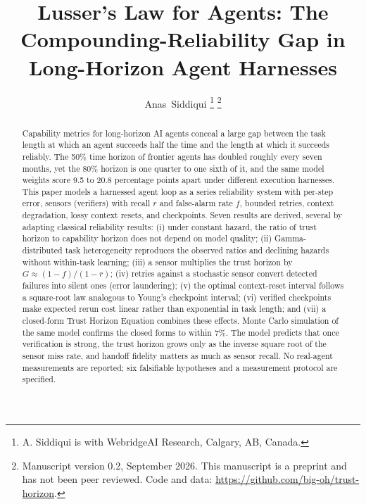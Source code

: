\documentclass[journal]{IEEEtran}
\begin{document}

\title{Lusser's Law for Agents: The Compounding-Reliability Gap in Long-Horizon Agent Harnesses}

\author{Anas~Siddiqui%
\thanks{A. Siddiqui is with WebridgeAI Research, Calgary, AB, Canada.}%
\thanks{Manuscript version 0.2, September 2026. This manuscript is a preprint and has not been peer reviewed. Code and data: \url{https://github.com/big-oh/trust-horizon}.}}


\maketitle

\begin{abstract}
Capability metrics for long-horizon AI agents conceal a large gap between the task length at which an agent succeeds half the time and the length at which it succeeds reliably. The 50\% time horizon of frontier agents has doubled roughly every seven months, yet the 80\% horizon is one quarter to one sixth of it, and the same model weights score 9.5 to 20.8 percentage points apart under different execution harnesses. This paper models a harnessed agent loop as a series reliability system with per-step error, sensors (verifiers) with recall $r$ and false-alarm rate $f$, bounded retries, context degradation, lossy context resets, and checkpoints. Seven results are derived, several by adapting classical reliability results: (i) under constant hazard, the ratio of trust horizon to capability horizon does not depend on model quality; (ii) Gamma-distributed task heterogeneity reproduces the observed ratios and declining hazards without within-task learning; (iii) a sensor multiplies the trust horizon by $G\approx(1-f)/(1-r)$; (iv) retries against a stochastic sensor convert detected failures into silent ones (error laundering); (v) the optimal context-reset interval follows a square-root law analogous to Young's checkpoint interval; (vi) verified checkpoints make expected rerun cost linear rather than exponential in task length; and (vii) a closed-form Trust Horizon Equation combines these effects. Monte Carlo simulation of the same model confirms the closed forms to within 7\%. The model predicts that once verification is strong, the trust horizon grows only as the inverse square root of the sensor miss rate, and handoff fidelity matters as much as sensor recall. No real-agent measurements are reported; six falsifiable hypotheses and a measurement protocol are specified.
\end{abstract}
\end{document}
